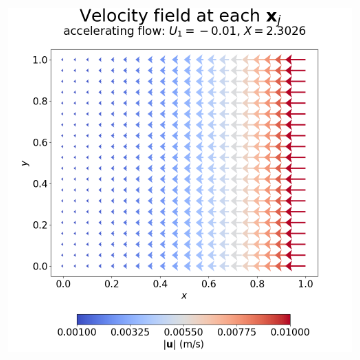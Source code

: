             \begin{figure}
                \begin{subfigure}{0.4\textwidth}
                    \centering
                    \includegraphics[width=\textwidth]{diagrams/results-mri/simple-tests/mri-spins_quiver_2D_accelerating_test_5.png}
                    \caption{}
                    \label{fig:mri-accelerating:quiver}
                \end{subfigure}
                \vspace{4mm} %
                \begin{subfigure}{0.4\textwidth}
                    \centering

\end{subfigure}
\end{figure}
